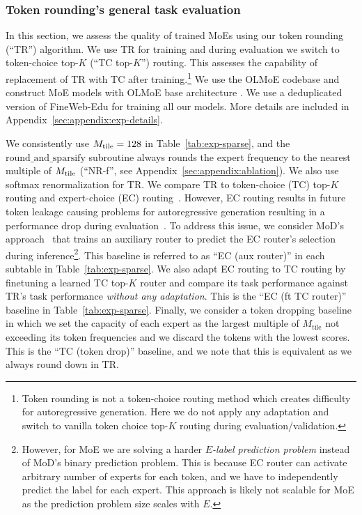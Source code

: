 \subsubsection{Token rounding's general task evaluation} \label{sec:exp:token_round_perf}



In this section, we assess the quality of trained MoEs using our token rounding (``TR'') algorithm. We use TR for training and during evaluation we switch to token-choice top-$K$ (``TC top-$K$'') routing. This assesses the capability of replacement of TR with TC after training.\footnote{Token rounding is not a token-choice routing method which creates difficulty for autoregressive generation. Here we do not apply any adaptation and switch to vanilla token choice top-$K$ routing during evaluation/validation.} We use the OLMoE codebase and construct MoE models with OLMoE base architecture \citep{muennighoff2024olmoe}. We use a deduplicated version of FineWeb-Edu \citep{benallal2024smollmcorpus} for training all our models. More details are included in Appendix~\ref{sec:appendix:exp-details}.

We consistently use $M_\mathrm{tile}=128$ in Table~\ref{tab:exp-sparse}, and the $\mathrm{round\_and\_sparsify}$ subroutine always rounds the expert frequency to the nearest multiple of $M_\mathrm{tile}$ (``NR-f'', see Appendix~\ref{sec:appendix:ablation}). We also use softmax renormalization for TR. We compare TR to token-choice (TC) top-$K$ routing and expert-choice (EC) routing~\citep{zhou2022mixture}. However, EC routing results in future token leakage causing problems for autoregressive generation resulting in a performance drop during evaluation~\citep{raposo2024mixture,wang2024auxiliary}. To address this issue, we consider MoD's approach~\citep{raposo2024mixture} that trains an auxiliary router to predict the EC router's selection during inference\footnote{However, for MoE we are solving a harder \textit{$E$-label prediction problem} instead of MoD's\citep{raposo2024mixture} binary prediction problem. This is because EC router can activate arbitrary number of experts for each token, and we have to independently predict the label for each expert. This approach is likely not scalable for MoE as the prediction problem size scales with $E$. }. This baseline is referred to as ``EC (aux router)'' in each subtable in Table~\ref{tab:exp-sparse}. We also adapt EC routing to TC routing by finetuning a learned TC top-$K$ router and compare its task performance against TR's task performance \textit{without any adaptation}. This is the ``EC (ft TC router)'' baseline in Table~\ref{tab:exp-sparse}. Finally, we consider a token dropping baseline in which we set the capacity of each expert as the largest multiple of $M_\mathrm{tile}$ not exceeding its token frequencies and we discard the tokens with the lowest scores. This is the ``TC (token drop)'' baseline, and we note that this is equivalent as we always round down in TR.


